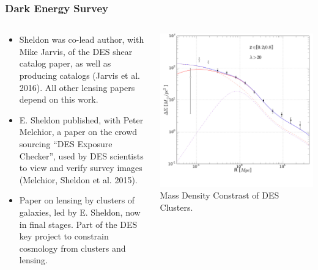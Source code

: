 \documentclass{beamer}
\begin{document}
\frame
{

    \frametitle{Dark Energy Survey}

    \fontsize{9}{0.8\baselineskip}

    \begin{columns}

        \begin{column}{0.5\textwidth}

            \begin{itemize}

                \item Sheldon was co-lead author, with Mike Jarvis, of the DES shear catalog
                    paper, as well as producing catalogs (Jarvis et al. 2016).  All
                    other lensing papers depend on this work.


                \item E. Sheldon published, with Peter Melchior, a paper on the crowd
                    sourcing ``DES Exposure Checker'', used by DES scientists
                    to view and verify survey images (Melchior, Sheldon et al. 2015).

                \item Paper on lensing by clusters of galaxies, led by E. Sheldon,
                    now in final stages.  Part of the DES key project to constrain
                    cosmology from clusters and lensing.

            \end{itemize}

        \end{column}

        \begin{column}{0.5\textwidth}
            \includegraphics[scale=0.17]{delta_sigma_best_fit_z9_l9.pdf}
            \newline
            {\tiny Mass Density Constrast of DES Clusters.}
        \end{column}


\end{columns}}
\end{document}
